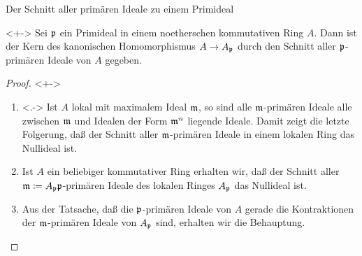 \begin{frame}{Der Schnitt aller primären Ideale zu einem Primideal}
	\begin{corollary}<+->
		Sei \(\mathfrak{p}\) ein Primideal in einem noetherschen kommutativen Ring \(A\). Dann ist der Kern des
		kanonischen Homomorphismus \(A \to A_{\mathfrak{p}}\) durch den Schnitt aller \(\mathfrak{p}\)-primären Ideale von \(A\)
		gegeben.
	\end{corollary}
	\begin{proof}<+->
		\begin{enumerate}[<+->]
		\item<.->
			Ist \(A\) lokal mit maximalem Ideal \(\mathfrak{m}\), so sind alle \(\mathfrak{m}\)-primären Ideale alle
			zwischen \(\mathfrak{m}\)
			und Idealen der Form \(\mathfrak{m}^n\) liegende Ideale. Damit zeigt die letzte Folgerung, daß der Schnitt
			aller \(\mathfrak{m}\)-primären Ideale in einem lokalen Ring das Nullideal ist.
		\item
			Ist \(A\) ein beliebiger kommutativer Ring erhalten wir, daß der Schnitt aller
			\(\mathfrak{m} \coloneqq A_{\mathfrak{p}} \mathfrak{p}\)-primären Ideale
			des lokalen Ringes \(A_{\mathfrak{p}}\) das Nullideal ist.
		\item
			Aus der Tatsache, daß die \(\mathfrak{p}\)-primären Ideale von \(A\) gerade die Kontraktionen der
			\(\mathfrak{m}\)-primären Ideale von \(A_{\mathfrak{p}}\) sind, erhalten wir die Behauptung.
			\qedhere
		\end{enumerate}
	\end{proof}
\end{frame}

